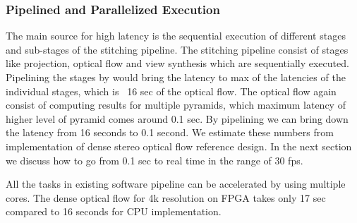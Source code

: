 \subsubsection{Pipelined and Parallelized Execution}
The main source for high latency is the sequential execution of different stages and sub-stages of the stitching pipeline. The stitching pipeline consist of stages like projection, optical flow and view synthesis which are sequentially executed. Pipelining the stages by would bring the latency to max of the latencies of the individual stages, which is ~16 sec of the optical flow. The optical flow again consist of computing results for multiple pyramids, which maximum latency of higher level of pyramid comes around 0.1 sec. By pipelining we can bring down the latency from 16 seconds to 0.1 second. We estimate these numbers from \cite{denseOFlowXilinx} implementation of dense stereo optical flow reference design. In the next section we discuss how to go from 0.1 sec to real time in the range of 30 fps. \newline

All the tasks in existing software pipeline can be accelerated by using multiple cores. The dense optical flow for 4k resolution on FPGA takes only 17 sec compared to 16 seconds for CPU implementation. 

